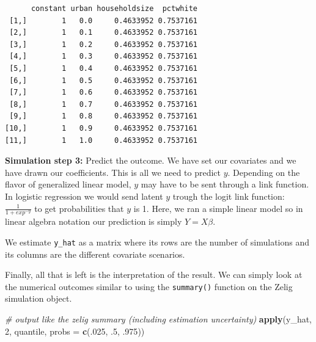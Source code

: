 \documentclass[]{article}
\newenvironment{Shaded}{\begin{snugshade}}{\end{snugshade}}
\newcommand{\CommentTok}[1]{\textcolor[rgb]{0.56,0.35,0.01}{\textit{#1}}}
\newcommand{\DataTypeTok}[1]{\textcolor[rgb]{0.13,0.29,0.53}{#1}}
\newcommand{\DecValTok}[1]{\textcolor[rgb]{0.00,0.00,0.81}{#1}}
\newcommand{\FloatTok}[1]{\textcolor[rgb]{0.00,0.00,0.81}{#1}}
\newcommand{\KeywordTok}[1]{\textcolor[rgb]{0.13,0.29,0.53}{\textbf{#1}}}
\newcommand{\NormalTok}[1]{#1}
\newcommand{\OperatorTok}[1]{\textcolor[rgb]{0.81,0.36,0.00}{\textbf{#1}}}
\newcommand{\StringTok}[1]{\textcolor[rgb]{0.31,0.60,0.02}{#1}}
\begin{document}
\begin{verbatim}
      constant urban householdsize  pctwhite
 [1,]        1   0.0     0.4633952 0.7537161
 [2,]        1   0.1     0.4633952 0.7537161
 [3,]        1   0.2     0.4633952 0.7537161
 [4,]        1   0.3     0.4633952 0.7537161
 [5,]        1   0.4     0.4633952 0.7537161
 [6,]        1   0.5     0.4633952 0.7537161
 [7,]        1   0.6     0.4633952 0.7537161
 [8,]        1   0.7     0.4633952 0.7537161
 [9,]        1   0.8     0.4633952 0.7537161
[10,]        1   0.9     0.4633952 0.7537161
[11,]        1   1.0     0.4633952 0.7537161
\end{verbatim}

\textbf{Simulation step 3:} Predict the outcome. We have set our covariates and we have drawn our coefficients. This is all we need to predict \(y\). Depending on the flavor of generalized linear model, \(y\) may have to be sent through a link function. In logistic regression we would send latent \(y\) trough the logit link function: \(\frac{1}{1 + exp^{-y}}\) to get probabilities that \(y\) is 1. Here, we ran a simple linear model so in linear algebra notation our prediction is simply \(Y=X\beta\).

We estimate \texttt{y\_hat} as a matrix where its rows are the number of simulations and its columns are the different covariate scenarios.

\begin{Shaded}
\end{Shaded}

Finally, all that is left is the interpretation of the result. We can simply look at the numerical outcomes similar to using the \texttt{summary()} function on the Zelig simulation object.

\begin{Shaded}
\begin{Highlighting}[]
\CommentTok{# output like the zelig summary (including estimation uncertainty)}
\KeywordTok{apply}\NormalTok{(y_hat, }\DecValTok{2}\NormalTok{, quantile, }\DataTypeTok{probs =} \KeywordTok{c}\NormalTok{(.}\DecValTok{025}\NormalTok{, }\FloatTok{.5}\NormalTok{, }\FloatTok{.975}\NormalTok{))}
\end{Highlighting}
\end{Shaded}
\end{document}

